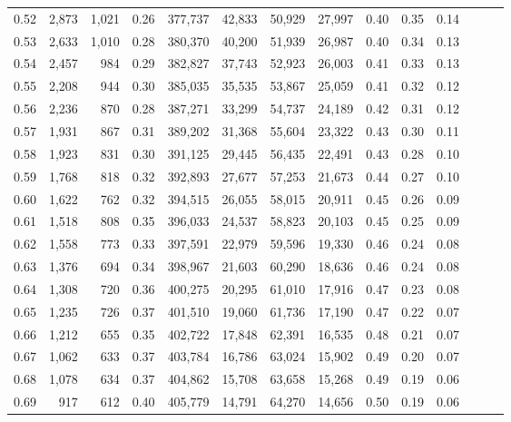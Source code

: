 \begin{tabular}{rrrrrrrrrrrrrr}
0.52 &   2,873 &  1,021 &  0.26 &  377,737 &   42,833 &  50,929 &  27,997 &  0.40 &  0.35 &      0.14 \\
0.53 &   2,633 &  1,010 &  0.28 &  380,370 &   40,200 &  51,939 &  26,987 &  0.40 &  0.34 &      0.13 \\
0.54 &   2,457 &    984 &  0.29 &  382,827 &   37,743 &  52,923 &  26,003 &  0.41 &  0.33 &      0.13 \\
0.55 &   2,208 &    944 &  0.30 &  385,035 &   35,535 &  53,867 &  25,059 &  0.41 &  0.32 &      0.12 \\
0.56 &   2,236 &    870 &  0.28 &  387,271 &   33,299 &  54,737 &  24,189 &  0.42 &  0.31 &      0.12 \\
0.57 &   1,931 &    867 &  0.31 &  389,202 &   31,368 &  55,604 &  23,322 &  0.43 &  0.30 &      0.11 \\
0.58 &   1,923 &    831 &  0.30 &  391,125 &   29,445 &  56,435 &  22,491 &  0.43 &  0.28 &      0.10 \\
0.59 &   1,768 &    818 &  0.32 &  392,893 &   27,677 &  57,253 &  21,673 &  0.44 &  0.27 &      0.10 \\
0.60 &   1,622 &    762 &  0.32 &  394,515 &   26,055 &  58,015 &  20,911 &  0.45 &  0.26 &      0.09 \\
0.61 &   1,518 &    808 &  0.35 &  396,033 &   24,537 &  58,823 &  20,103 &  0.45 &  0.25 &      0.09 \\
0.62 &   1,558 &    773 &  0.33 &  397,591 &   22,979 &  59,596 &  19,330 &  0.46 &  0.24 &      0.08 \\
0.63 &   1,376 &    694 &  0.34 &  398,967 &   21,603 &  60,290 &  18,636 &  0.46 &  0.24 &      0.08 \\
0.64 &   1,308 &    720 &  0.36 &  400,275 &   20,295 &  61,010 &  17,916 &  0.47 &  0.23 &      0.08 \\
0.65 &   1,235 &    726 &  0.37 &  401,510 &   19,060 &  61,736 &  17,190 &  0.47 &  0.22 &      0.07 \\
0.66 &   1,212 &    655 &  0.35 &  402,722 &   17,848 &  62,391 &  16,535 &  0.48 &  0.21 &      0.07 \\
0.67 &   1,062 &    633 &  0.37 &  403,784 &   16,786 &  63,024 &  15,902 &  0.49 &  0.20 &      0.07 \\
0.68 &   1,078 &    634 &  0.37 &  404,862 &   15,708 &  63,658 &  15,268 &  0.49 &  0.19 &      0.06 \\
0.69 &     917 &    612 &  0.40 &  405,779 &   14,791 &  64,270 &  14,656 &  0.50 &  0.19 &      0.06 \\

\end{tabular}
